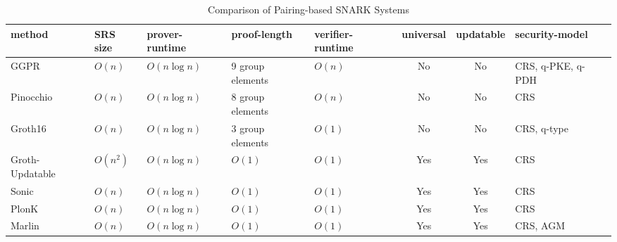 \begin{table}[H]
\caption{Comparison of Pairing-based SNARK Systems}
\begin{tabular}{|l|l|l|l|l|c|c|l|}
\hline
\toprule
method & SRS size & prover-runtime & proof-length & verifier-runtime & universal & updatable & security-model \\ \hline\toprule
\midrule
GGPR & $O(n)$ & $O(n \log n)$ & 9 group elements & $O(n)$ & No & No & CRS, q-PKE, q-PDH \\ \hline
Pinocchio & $O(n)$ & $O(n \log n)$ & 8 group elements & $O(n)$ & No & No & CRS \\ \hline
Groth16 & $O(n)$ & $O(n \log n)$ & 3 group elements & $O(1)$ & No & No & CRS, q-type \\ \hline
Groth-Updatable & $O(n^2)$ & $O(n \log n)$ & $O(1)$ & $O(1)$ & Yes & Yes & CRS \\ \hline
Sonic & $O(n)$ & $O(n \log n)$ & $O(1)$ & $O(1)$ & Yes & Yes & CRS \\ \hline
PlonK & $O(n)$ & $O(n \log n)$ & $O(1)$ & $O(1)$ & Yes & Yes & CRS \\ \hline
Marlin & $O(n)$ & $O(n \log n)$ & $O(1)$ & $O(1)$ & Yes & Yes & CRS, AGM \\ \hline\bottomrule
\bottomrule
\end{tabular}
\end{table}
